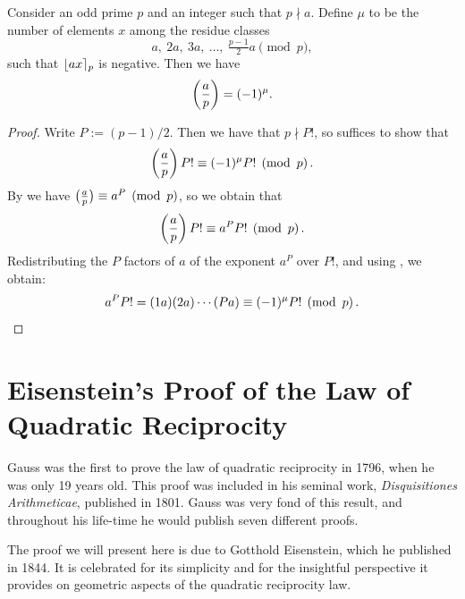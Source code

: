 \begin{lemma}\label{lemma:gausss-lemma}
  Consider an odd prime $p$ and an integer such that $p\nmid a$. Define $\mu$ to be the number of elements $x$ among the residue classes
  \begin{equation*}
    a,~2a,~3a,~\ldots,~\tfrac{p-1}{2}a\pmod{p},
  \end{equation*}
  such that $\lres{ax}{p}$ is negative. Then we have
  \begin{equation*}
    \legendre{a}{p}=(-1)^\mu.
  \end{equation*}
\end{lemma}

\begin{proof}
  Write $P:=(p-1)/2$. Then we have that $p\nmid P!$, so suffices to show that
  \begin{equation*}
    \legendre{a}{p}P!\equiv (-1)^\mu P!\pmod{p}.
  \end{equation*}
  By  we have $\legendre{a}{p}\equiv a^{P}\pmod{p}$, so we obtain that
  \begin{equation*}
    \legendre{a}{p}P!\equiv a^P P! \pmod{p}.
  \end{equation*}
  Redistributing the $P$ factors of $a$ of the exponent $a^P$ over $P!$, and using , we obtain:
  \begin{equation*}
    a^P P! = (1a)(2a)\cdots(Pa) \equiv (-1)^\mu P! \pmod{p}.\qedhere
  \end{equation*}
\end{proof}

\section[Eisenstein's Proof]{Eisenstein's Proof of the Law of Quadratic Reciprocity}

Gauss was the first to prove the law of quadratic reciprocity in 1796, when he was only 19 years old. This proof was included in his seminal work, \emph{Disquisitiones Arithmeticae}, published in 1801. Gauss was very fond of this result, and throughout his life-time he would publish seven different proofs.

The proof we will present here is due to Gotthold Eisenstein, which he published in 1844. It is celebrated for its simplicity and for the insightful perspective it provides on geometric aspects of the quadratic reciprocity law.


